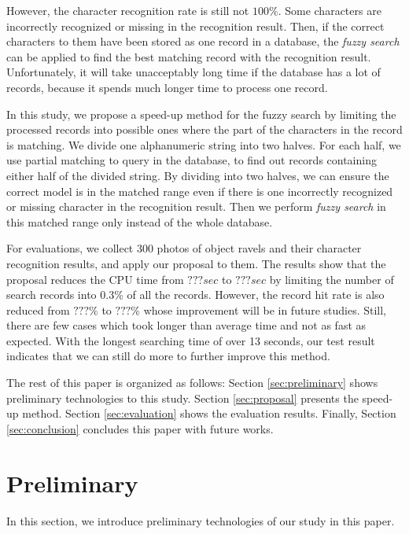 \documentclass[technicalreport]{ieicej}
\begin{document}
    However, the character recognition rate is still not $100\%$. Some characters are incorrectly recognized or missing in the recognition result. Then, if the correct characters to them have been stored as one record in a database, the {\em fuzzy search} can be applied to find the best matching record with the recognition result. Unfortunately, it will take unacceptably long time if the database has a lot of records, because it spends much longer time to process one record. 

    In this study, we propose a speed-up method for the fuzzy search by limiting the processed records into possible ones where the part of the characters in the record is matching. 
    We divide one alphanumeric string into two halves. For each half, we use partial matching to query in the database, to find out records containing either half of the divided string. By dividing into two halves, we can ensure the correct model is in the matched range even if there is one incorrectly recognized or missing character in the recognition result. Then we perform {\em fuzzy search} in this matched range only instead of the whole database. 

    For evaluations, we collect 300 photos of object ravels and their character recognition results, and apply our proposal to them. The results show that the proposal reduces the CPU time from $???sec$ to $???sec$ by limiting the number of search records into 0.3\% of all the records. However, the record hit rate is also reduced from $???\%$ to $???\%$ whose improvement will be in future studies.
    Still, there are few cases which took longer than average time and not as fast as expected. With the longest searching time of over 13 seconds, our test result indicates that we can still do more to further improve this method.

    The rest of this paper is organized as follows:
    Section \ref{sec:preliminary} shows preliminary technologies to this study.
    Section \ref{sec:proposal} presents the speed-up method.
    Section \ref{sec:evaluation} shows the evaluation results.
    Finally, Section \ref{sec:conclusion} concludes this paper with future works.


\section{Preliminary}
\label{sec:efp}
    In this section, we introduce preliminary technologies of our study in this paper.
\end{document}
